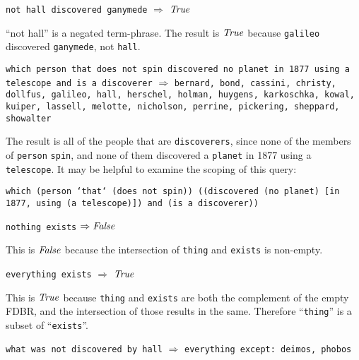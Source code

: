 \documentclass[../main.tex]{subfiles}
\begin{document}
\begin{refsection}


\examplespacing

\texttt{not hall discovered ganymede} $\Rightarrow$ $\operatorname{\mathit{True}}$

\examplespacing

\noindent ``not hall'' is a negated term-phrase.  The result is $\operatorname{\mathit{True}}$ because \texttt{galileo} discovered \texttt{ganymede}, not \texttt{hall}.

\examplespacing

\texttt{which person that does not spin discovered no planet in 1877 using a telescope and is a discoverer} $\Rightarrow$ \texttt{bernard, bond, cassini, christy, dollfus, galileo, hall, herschel, holman, huygens, karkoschka, kowal, kuiper, lassell, melotte, nicholson, perrine, pickering, sheppard, showalter}

\examplespacing

\noindent The result is all of the people that are \texttt{discoverers}, since none of the members of \texttt{person} \texttt{spin}, and none of them discovered a \texttt{planet} in 1877 using a \texttt{telescope}.  It may be helpful to examine the scoping of this query:

\examplespacing

\texttt{which (person `that` (does not spin)) ((discovered (no planet) [in 1877, using (a telescope)]) and (is a discoverer))}

\examplespacing

\texttt{nothing exists} $\Rightarrow \operatorname{\mathit{False}}$

\examplespacing

\noindent This is $\operatorname{\mathit{False}}$ because the intersection of \texttt{thing} and \texttt{exists} is non-empty.

\examplespacing

\texttt{everything exists} $\Rightarrow$ $\operatorname{\mathit{True}}$

\examplespacing

\noindent This is $\operatorname{\mathit{True}}$ because \texttt{thing} and \texttt{exists} are both the complement of the empty FDBR, and the intersection of those results in the same.  Therefore ``\texttt{thing}'' is a subset of ``\texttt{exists}''.

\examplespacing

\texttt{what was not discovered by hall} $\Rightarrow$ \texttt{everything except: deimos, phobos}


\end{refsection}
\end{document}
